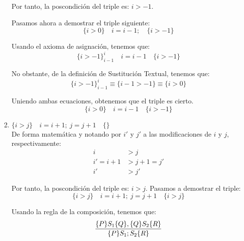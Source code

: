 \begin{ejercicio}
\begin{enumerate}
            Por tanto, la poscondición del triple es: $i > -1$.

            Pasamos ahora a demostrar el triple siguiente:
            \begin{equation*}
                \{i > 0\} \quad i = i - 1; \quad \{i > -1\}
            \end{equation*}

            Usando el axioma de asignación, tenemos que:
            \begin{equation*}
                \{i > -1\}^i_{i-1}\quad i=i-1\quad \{i>-1\}
            \end{equation*}

            No obstante, de la definición de Sustitución Textual, tenemos que:
            \begin{equation*}
                \{i > -1\}^i_{i-1} \equiv \{i-1 > -1\} \equiv \{i > 0\}
            \end{equation*}

            Uniendo ambas ecuaciones, obtenemos que el triple es cierto.
            \begin{equation*}
                \{i > 0\}\quad i = i - 1\quad \{i > -1\}
            \end{equation*}

        \item $\{i > j\} \quad i = i + 1;~j = j + 1 \quad \{ \}$\\
            De forma matemática y notando por $i'$ y $j'$ a las modificaciones de $i$ y $j$, respectivamente:
            \begin{align*}
                i &> j \\
                i' = i+1 &> j+1=j'\\
                i' &> j'
            \end{align*}

            Por tanto, la poscondición del triple es: $i > j$. Pasamos a demostrar el triple:
            \begin{equation*}
                \{i > j\} \quad i = i + 1;~j = j + 1 \quad \{i>j\}
            \end{equation*}

            Usando la regla de la composición, tenemos que:
            \begin{equation*}
                \dfrac{\{P\}S_1\{Q\}, \{Q\}S_2\{R\}}{\{P\}S_1;S_2\{R\}} \\
            \end{equation*}


\end{enumerate}
\end{ejercicio}
